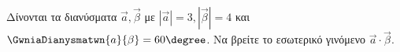 Δίνονται τα διανύσματα $ \vec{a},\vec{\beta} $ με $ |\vec{a}|=3,|\vec{\beta}|=4 $ και $\GwniaDianysmatwn{a}{\beta} =60\degree$. Να βρείτε το εσωτερικό γινόμενο $ \vec{a}\cdot\vec{\beta} $.
